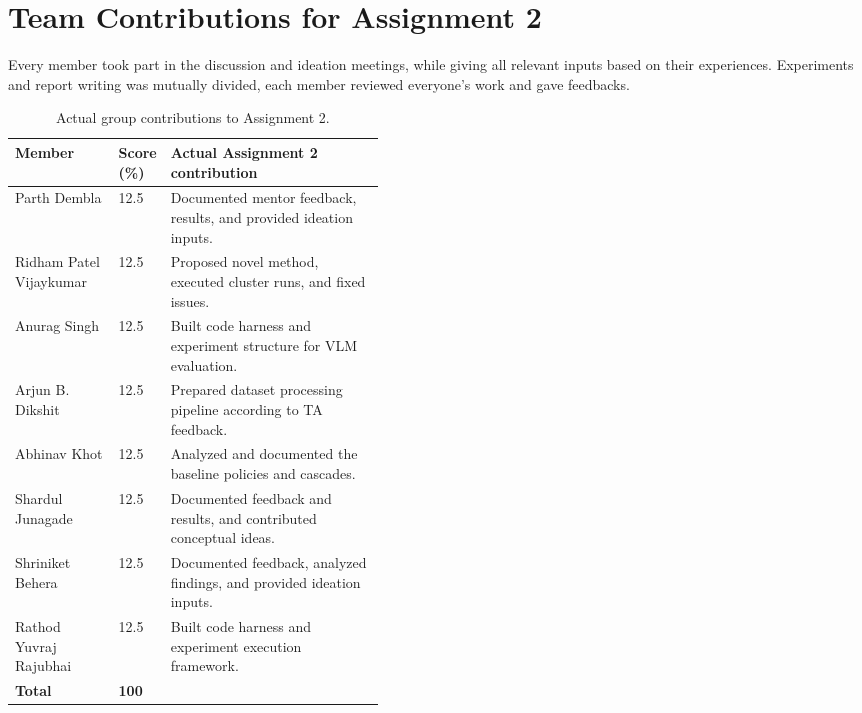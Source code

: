 \documentclass[11pt]{article}
\begin{document}
\section{Team Contributions for Assignment 2}

Every member took part in the discussion and ideation meetings, while giving all relevant inputs based on their experiences. Experiments and report writing was mutually divided, each member reviewed everyone's work and gave feedbacks.

\begin{table}[H]
\centering
\small
\begin{tabularx}{\linewidth}{p{0.29\linewidth} p{0.14\linewidth} Y}
\toprule
\textbf{Member} & \textbf{Score (\%)} & \textbf{Actual Assignment 2 contribution} \\
\midrule
Parth Dembla & 12.5 & Documented mentor feedback, results, and provided ideation inputs. \\
Ridham Patel Vijaykumar & 12.5 & Proposed novel method, executed cluster runs, and fixed issues. \\
Anurag Singh & 12.5 & Built code harness and experiment structure for VLM evaluation. \\
Arjun B. Dikshit & 12.5 & Prepared dataset processing pipeline according to TA feedback. \\
Abhinav Khot & 12.5 & Analyzed and documented the baseline policies and cascades. \\
Shardul Junagade & 12.5 & Documented feedback and results, and contributed conceptual ideas. \\
Shriniket Behera & 12.5 & Documented feedback, analyzed findings, and provided ideation inputs. \\
Rathod Yuvraj Rajubhai & 12.5 & Built code harness and experiment execution framework. \\
\midrule
\textbf{Total} & \textbf{100} & \\
\bottomrule
\end{tabularx}
\caption{Actual group contributions to Assignment 2.}
\label{tab:contributions}
\end{table}



\end{document}
